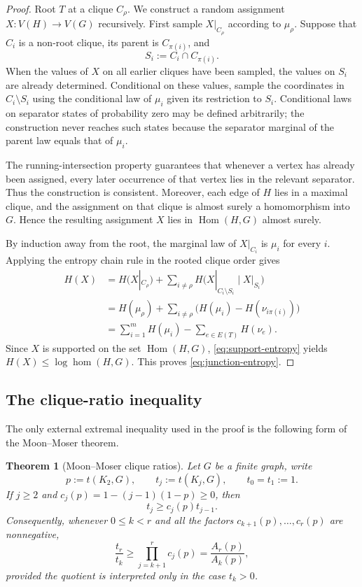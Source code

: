 \documentclass[11pt]{article}
\newtheorem{theorem}{Theorem}[section]
\numberwithin{equation}{section}
\DeclareMathOperator{\Hom}{Hom}
\DeclareMathOperator{\homnum}{hom}
\newcommand{\K}{K}
\begin{document}
\begin{proof}
Root $T$ at a clique $C_\rho$.  We construct a random assignment
$X:V(H)\to V(G)$ recursively.  First sample $X|_{C_\rho}$ according to
$\mu_\rho$.  Suppose that $C_i$ is a non-root clique, its parent is
$C_{\pi(i)}$, and
\[
 S_i:=C_i\cap C_{\pi(i)}.
\]
When the values of $X$ on all earlier cliques have been sampled, the
values on $S_i$ are already determined.  Conditional on these values,
sample the coordinates in $C_i\setminus S_i$ using the conditional law
of $\mu_i$ given its restriction to $S_i$.  Conditional laws on
separator states of probability zero may be defined arbitrarily; the
construction never reaches such states because the separator marginal
of the parent law equals that of $\mu_i$.

The running-intersection property guarantees that whenever a vertex has
already been assigned, every later occurrence of that vertex lies in the
relevant separator.  Thus the construction is consistent.  Moreover,
each edge of $H$ lies in a maximal clique, and the assignment on that
clique is almost surely a homomorphism into $G$.  Hence the resulting
assignment $X$ lies in $\Hom(H,G)$ almost surely.

By induction away from the root, the marginal law of $X|_{C_i}$ is
$\mu_i$ for every $i$.  Applying the entropy chain rule in the rooted
clique order gives
\[
 \begin{aligned}
 H(X)
 &=H(X|_{C_\rho})
   +\sum_{i\neq\rho}
     H\bigl(X|_{C_i\setminus S_i}\mid X|_{S_i}\bigr)\\
 &=H(\mu_\rho)
   +\sum_{i\neq\rho}\bigl(H(\mu_i)-H(\nu_{i\pi(i)})\bigr)\\
 &=\sum_{i=1}^mH(\mu_i)-\sum_{e\in E(T)}H(\nu_e).
 \end{aligned}
\]
Since $X$ is supported on the set $\Hom(H,G)$,
\eqref{eq:support-entropy} yields
$H(X)\leq\log\homnum(H,G)$.  This proves
\eqref{eq:junction-entropy}.
\end{proof}

\subsection{The clique-ratio inequality}

The only external extremal inequality used in the proof is the following
form of the Moon--Moser theorem.

\begin{theorem}[Moon--Moser clique ratios]\label{thm:moon-moser}
Let $G$ be a finite graph, write
\[
 p:=t(\K_2,G),
 \qquad
 t_j:=t(\K_j,G),
 \qquad
 t_0=t_1:=1.
\]
If $j\geq2$ and $c_j(p)=1-(j-1)(1-p)\geq0$, then
\begin{equation}
 t_j\geq c_j(p)t_{j-1}.\label{eq:moon-moser}
\end{equation}
Consequently, whenever $0\leq k<r$ and all the factors
$c_{k+1}(p),\dots,c_r(p)$ are nonnegative,
\begin{equation}
 \frac{t_r}{t_k}
 \geq
 \prod_{j=k+1}^r c_j(p)
 =
 \frac{A_r(p)}{A_k(p)},\label{eq:moon-moser-iterated}
\end{equation}
provided the quotient is interpreted only in the case $t_k>0$.
\end{theorem}
\end{document}
